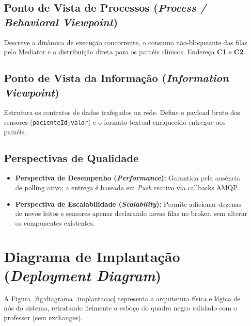 \documentclass[12pt,a4paper]{article}
\begin{document}
\subsection{Ponto de Vista de Processos (\textit{Process / Behavioral Viewpoint})}
Descreve a dinâmica de execução concorrente, o consumo não-bloqueante das filas pelo Mediator e a distribuição direta para os painéis clínicos. Endereça \textbf{C1} e \textbf{C2}.

\subsection{Ponto de Vista da Informação (\textit{Information Viewpoint})}
Estrutura os contratos de dados trafegados na rede. Define o payload bruto dos sensores (\texttt{pacienteId;valor}) e o formato textual enriquecido entregue aos painéis.

\subsection{Perspectivas de Qualidade}
\begin{itemize}
    \item \textbf{Perspectiva de Desempenho (\textit{Performance}):} Garantida pela ausência de polling ativo; a entrega é baseada em \textit{Push} reativo via callbacks AMQP.
    \item \textbf{Perspectiva de Escalabilidade (\textit{Scalability}):} Permite adicionar dezenas de novos leitos e sensores apenas declarando novas filas no broker, sem alterar os componentes existentes.
\end{itemize}

\newpage
\section{Diagrama de Implantação (\textit{Deployment Diagram})}
\label{sec:implantacao}

A Figura~\ref{fig:diagrama_implantacao} representa a arquitetura física e lógica de nós do sistema, retratando fielmente o esboço do quadro negro validado com o professor (sem exchanges).
\end{document}
